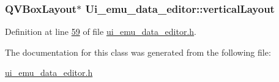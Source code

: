 \hypertarget{a00079_a11b9c1ae90724f0bcd67c76045c93704}{
\subsubsection[{vertical\+Layout}]{\setlength{\rightskip}{0pt plus 5cm}Q\+V\+Box\+Layout$\ast$ Ui\+\_\+emu\+\_\+data\+\_\+editor\+::vertical\+Layout}}\label{a00079_a11b9c1ae90724f0bcd67c76045c93704}


Definition at line \hyperlink{a00138_source_l00059}{59} of file \hyperlink{a00138_source}{ui\+\_\+emu\+\_\+data\+\_\+editor.\+h}.



The documentation for this class was generated from the following file\+:\begin{DoxyCompactItemize}
\item 
\hyperlink{a00138}{ui\+\_\+emu\+\_\+data\+\_\+editor.\+h}\end{DoxyCompactItemize}
